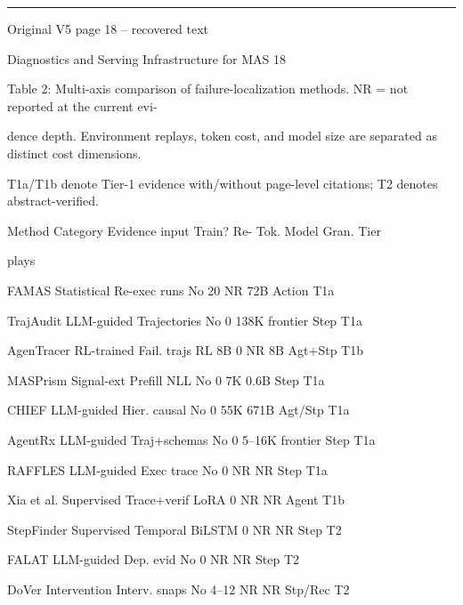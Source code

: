 \par\smallskip\noindent\rule{\textwidth}{0.4pt}\par{\sffamily\footnotesize Original V5 page 18 -- recovered text}\par\begin{flushleft}\footnotesize\ttfamily
\par\smallskip
\par\smallskip
\noindent Diagnostics and Serving Infrastructure for MAS 18\par
\par\smallskip
\par\smallskip
\noindent Table 2: Multi-axis comparison of failure-localization methods. NR = not reported at the current evi-\par
\noindent dence depth. Environment replays, token cost, and model size are separated as distinct cost dimensions.\par
\noindent T1a/T1b denote Tier-1 evidence with/without page-level citations; T2 denotes abstract-verified.\par
\par\smallskip
\noindent Method Category Evidence input Train? Re- Tok. Model Gran. Tier\par
\noindent  plays\par
\noindent FAMAS Statistical Re-exec runs No 20 NR 72B Action T1a\par
\noindent TrajAudit LLM-guided Trajectories No 0 138K frontier Step T1a\par
\noindent AgenTracer RL-trained Fail. trajs RL 8B 0 NR 8B Agt+Stp T1b\par
\noindent MASPrism Signal-ext Prefill NLL No 0 7K 0.6B Step T1a\par
\noindent CHIEF LLM-guided Hier. causal No 0 55K 671B Agt/Stp T1a\par
\noindent AgentRx LLM-guided Traj+schemas No 0 5–16K frontier Step T1a\par
\noindent RAFFLES LLM-guided Exec trace No 0 NR NR Step T1a\par
\noindent Xia et al. Supervised Trace+verif LoRA 0 NR NR Agent T1b\par
\noindent StepFinder Supervised Temporal BiLSTM 0 NR NR Step T2\par
\noindent FALAT LLM-guided Dep. evid No 0 NR NR Step T2\par
\noindent DoVer Intervention Interv. snaps No 4–12 NR NR Stp/Rec T2\par

\end{flushleft}
